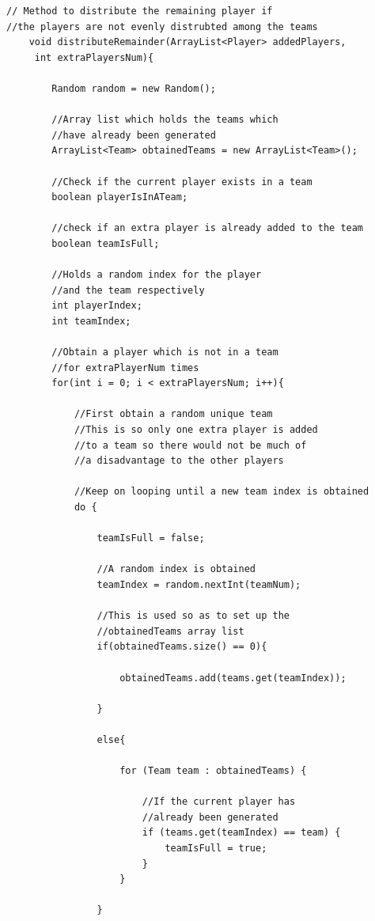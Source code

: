 \documentclass[a4paper,12pt]{extarticle}
\begin{document}
\begin{lstlisting}
// Method to distribute the remaining player if 
//the players are not evenly distrubted among the teams
    void distributeRemainder(ArrayList<Player> addedPlayers,
     int extraPlayersNum){

        Random random = new Random();

        //Array list which holds the teams which 
        //have already been generated
        ArrayList<Team> obtainedTeams = new ArrayList<Team>();

        //Check if the current player exists in a team
        boolean playerIsInATeam;

        //check if an extra player is already added to the team
        boolean teamIsFull;

        //Holds a random index for the player 
        //and the team respectively
        int playerIndex;
        int teamIndex;

        //Obtain a player which is not in a team 
        //for extraPlayerNum times
        for(int i = 0; i < extraPlayersNum; i++){

            //First obtain a random unique team
            //This is so only one extra player is added 
            //to a team so there would not be much of 
            //a disadvantage to the other players

            //Keep on looping until a new team index is obtained
            do {

                teamIsFull = false;

                //A random index is obtained
                teamIndex = random.nextInt(teamNum);

                //This is used so as to set up the 
                //obtainedTeams array list
                if(obtainedTeams.size() == 0){

                    obtainedTeams.add(teams.get(teamIndex));

                }

                else{

                    for (Team team : obtainedTeams) {

                        //If the current player has 
                        //already been generated
                        if (teams.get(teamIndex) == team) {
                            teamIsFull = true;
                        }
                    }

                }


\end{lstlisting}
\end{document}
